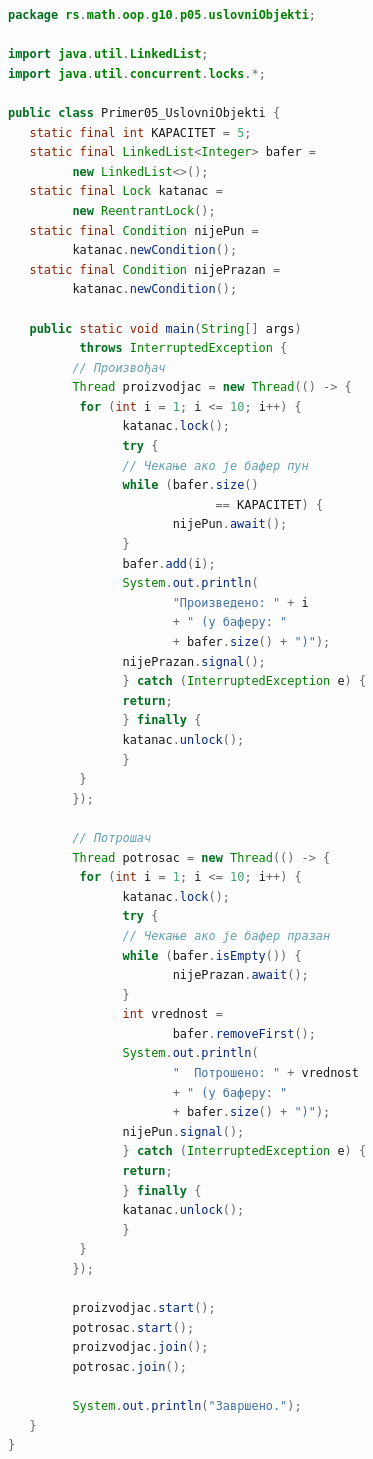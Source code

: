 \begin{lstlisting}[language=Java]
package rs.math.oop.g10.p05.uslovniObjekti;
 
import java.util.LinkedList;
import java.util.concurrent.locks.*;
 
public class Primer05_UslovniObjekti {
   static final int KAPACITET = 5;
   static final LinkedList<Integer> bafer =
         new LinkedList<>();
   static final Lock katanac =
         new ReentrantLock();
   static final Condition nijePun =
         katanac.newCondition();
   static final Condition nijePrazan =
         katanac.newCondition();
 
   public static void main(String[] args)
          throws InterruptedException {
         // Произвођач
         Thread proizvodjac = new Thread(() -> {
          for (int i = 1; i <= 10; i++) {
                katanac.lock();
                try {
                // Чекање ако је бафер пун
                while (bafer.size()
                             == KAPACITET) {
                       nijePun.await();
                }
                bafer.add(i);
                System.out.println(
                       "Произведено: " + i
                       + " (у баферу: "
                       + bafer.size() + ")");
                nijePrazan.signal();
                } catch (InterruptedException e) {
                return;
                } finally {
                katanac.unlock();
                }
          }
         });
 
         // Потрошач
         Thread potrosac = new Thread(() -> {
          for (int i = 1; i <= 10; i++) {
                katanac.lock();
                try {
                // Чекање ако је бафер празан
                while (bafer.isEmpty()) {
                       nijePrazan.await();
                }
                int vrednost =
                       bafer.removeFirst();
                System.out.println(
                       "  Потрошено: " + vrednost
                       + " (у баферу: "
                       + bafer.size() + ")");
                nijePun.signal();
                } catch (InterruptedException e) {
                return;
                } finally {
                katanac.unlock();
                }
          }
         });
 
         proizvodjac.start();
         potrosac.start();
         proizvodjac.join();
         potrosac.join();
 
         System.out.println("Завршено.");
   }
}
\end{lstlisting}


